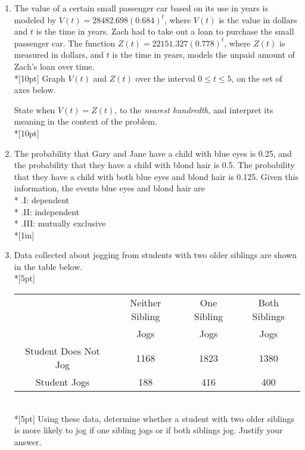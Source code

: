 \documentclass[12pt, twoside]{article}
\begin{document}
\begin{enumerate}
\newpage

\item The value of a certain small passenger car based on its use in years is modeled by $V(t) =28482.698(0.684)^t$, where $V(t)$ is the value in dollars and $t$ is the time in years. Zach had to take out a loan to purchase the small passenger car. The function $Z(t)=22151.327(0.778)^t$, where $Z(t)$ is measured in dollars, and $t$ is the time in years, models the unpaid amount of Zach’s loan over time.\\*[10pt]
Graph $V(t)$ and $Z(t)$ over the interval $0 \leq t \leq 5$, on the set of axes below.
\begin{center}
\end{center}
State when $V(t)=Z(t)$, to the \emph{nearest hundredth}, and interpret its meaning in the context of the problem.\\*[10pt]

\newpage

\item The probability that Gary and Jane have a child with blue eyes is 0.25, and the probability that they have a child with blond hair is 0.5. The probability that they have a child with both blue eyes and blond hair is 0.125. Given this information, the events blue eyes and blond hair are\\*
.\qquad I: dependent\\*
.\qquad II: independent\\*
.\qquad III: mutually exclusive\\*[1in] %

\item Data collected about jogging from students with two older siblings are shown in the table below.\\*[5pt]
\begin{tabular}{|c|c|c|c|}
\hline
& Neither Sibling & One Sibling & Both Siblings\\
& Jogs & Jogs & Jogs\\\hline
Student Does Not Jog & 1168 & 1823 & 1380 \\
\hline
Student Jogs & 188 & 416 & 400 \\
\hline
\end{tabular}\\*[5pt]
Using these data, determine whether a student with two older siblings is more likely to jog if one sibling jogs or if both siblings jog. Justify your answer. %


\end{enumerate}
\end{document}
